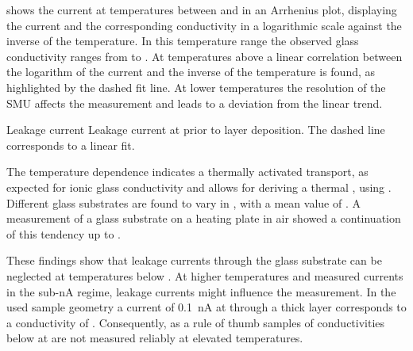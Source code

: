  shows the current at temperatures between \Tsub[25] and  in an Arrhenius plot, displaying the current and the corresponding conductivity in a logarithmic scale against the inverse of the temperature. In this temperature range the observed glass conductivity ranges from  to . At temperatures above  a linear correlation between the logarithm of the current and the inverse of the temperature is found, as highlighted by the dashed fit line. At lower temperatures the resolution of the SMU affects the measurement and leads to a deviation from the linear trend.

%
{Leakage current}
{Leakage current at \V[10] prior to layer deposition. The dashed line corresponds to a linear fit.}
%

The temperature dependence indicates a thermally activated transport, as expected for ionic glass conductivity\cite{Ingram1989} and allows for deriving a thermal \EactLong \Eact, using . Different glass substrates are found to vary in \Eact, with a mean value of \Eact[926].
A measurement of a glass substrate on a heating plate in air showed a continuation of this tendency up to .

These findings show that leakage currents through the glass substrate can be neglected at temperatures below . At higher temperatures and measured currents in the sub-\si{\nano\ampere} regime, leakage currents might influence the measurement. In the used sample geometry a current of \SI{0.1}{\nano\ampere} at \V[10] through a  thick layer corresponds to a conductivity of . Consequently, as a rule of thumb samples of conductivities below  at \T[50] are not measured reliably at elevated temperatures.
